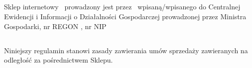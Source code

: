 

		\subsection{} 
		Sklep internetowy \shopname\ prowadzony jest przez \companyname\  wpisaną/wpisanego do Centralnej Ewidencji i Informacji o Działalności Gospodarczej prowadzonej przez Ministra Gospodarki, nr REGON \regon, nr NIP \nip
		
		\subsection{} 
		Niniejszy regulamin stanowi zasady zawierania umów sprzedaży zawieranych na odległość za pośrednictwem Sklepu. 
